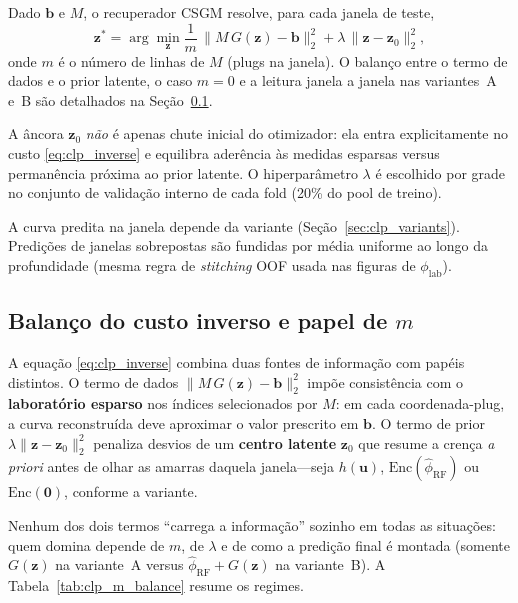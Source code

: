 \documentclass[11pt,a4paper]{article}
\newcommand{\philab}{\ensuremath{\phi_{\mathrm{lab}}}}
\newcommand{\zvec}{\ensuremath{\mathbf{z}}}
\newcommand{\zzero}{\ensuremath{\mathbf{z}_0}}
\begin{document}
Dado $\mathbf{b}$ e $M$, o recuperador CSGM resolve, para cada janela de
teste,
\begin{equation}
  \zvec^{\ast}
  =
  \arg\min_{\zvec}
  \frac{1}{m}\,\|M\,G(\zvec)-\mathbf{b}\|_2^2
  +
  \lambda\,\|\zvec-\zzero\|_2^2,
  \label{eq:clp_inverse}
\end{equation}
onde $m$ é o número de linhas de $M$ (plugs na janela).
O balanço entre o termo de dados e o prior latente, o caso $m=0$ e a
leitura janela a janela nas variantes~A e~B são detalhados na
Seção~\ref{sec:clp_balance}.

A âncora $\zzero$ \emph{não} é apenas chute inicial do otimizador: ela
entra explicitamente no custo \eqref{eq:clp_inverse} e equilibra
aderência às medidas esparsas versus permanência próxima ao prior
latente.
O hiperparâmetro $\lambda$ é escolhido por grade no conjunto de
validação interno de cada fold (20\% do pool de treino).

A curva predita na janela depende da variante (Seção~\ref{sec:clp_variants}).
Predições de janelas sobrepostas são fundidas por média uniforme ao longo
da profundidade (mesma regra de \emph{stitching} OOF usada nas figuras de
\philab{}).

\subsection{Balanço do custo inverso e papel de \texorpdfstring{$m$}{m}}
\label{sec:clp_balance}

A equação \eqref{eq:clp_inverse} combina duas fontes de informação com
papéis distintos.
O termo de dados
$\|M\,G(\zvec)-\mathbf{b}\|_2^2$
impõe consistência com o \textbf{laboratório esparso} nos índices
selecionados por $M$: em cada coordenada-plug, a curva reconstruída deve
aproximar o valor prescrito em $\mathbf{b}$.
O termo de prior
$\lambda\|\zvec-\zzero\|_2^2$
penaliza desvios de um \textbf{centro latente} $\zzero$ que resume a
crença \emph{a priori} antes de olhar as amarras daquela janela---seja
$h(\mathbf{u})$, $\mathrm{Enc}(\widehat{\phi}_{\mathrm{RF}})$ ou
$\mathrm{Enc}(\mathbf{0})$, conforme a variante.

Nenhum dos dois termos ``carrega a informação'' sozinho em todas as
situações: quem domina depende de $m$, de $\lambda$ e de como a predição
final é montada (somente $G(\zvec)$ na variante~A versus
$\widehat{\phi}_{\mathrm{RF}}+G(\zvec)$ na variante~B).
A Tabela~\ref{tab:clp_m_balance} resume os regimes.
\end{document}
